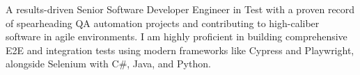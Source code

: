 A results-driven Senior Software Developer Engineer in Test with a proven record of spearheading QA automation projects and contributing to high-caliber software in agile environments. I am highly proficient in building comprehensive E2E and integration tests using modern frameworks like Cypress and Playwright, alongside Selenium with C\#, Java, and Python.